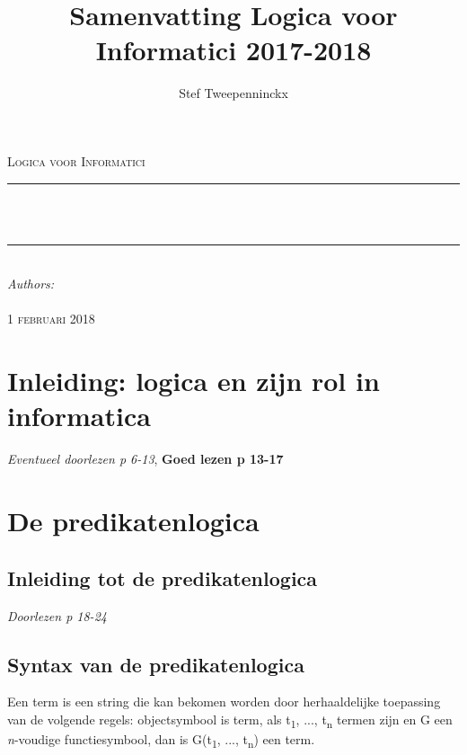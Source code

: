 \documentclass[11pt, a4paper]{article}
\author{Stef Tweepenninckx}
\title{Samenvatting Logica voor Informatici 2017-2018}
\makeatletter
\def\printtitle{                 
    {\large \@title}}
\def\printauthor{                  
    {\large \@author}}
\makeatother
\begin{document}
\begin{titlepage}
\newcommand{\HRule}{\rule{\linewidth}{0.5mm}} 
\center 
\textsc{\LARGE Logica voor Informatici}\\[1.5cm] 
\HRule \\[0.4cm]

{\huge \bfseries \printtitle}\\[0.4cm] 
\HRule \\[0.4cm]

\Large \emph{Authors:}\\
 \textsc{\printauthor}\\[3cm]

{\large \textsc{1 februari 2018}}\\[3cm] 

\vfill 
\end{titlepage}
\tableofcontents
\newpage
{}

\section{Inleiding: logica en zijn rol in informatica}
\textit{Eventueel doorlezen p 6-13}, \textbf{Goed lezen p 13-17}

\section{De predikatenlogica}
\subsection{Inleiding tot de predikatenlogica}
\textit{Doorlezen p 18-24}
\subsection{Syntax van de predikatenlogica}
Een term is een string die kan bekomen worden door herhaaldelijke toepassing van de volgende regels: objectsymbool is term, als t\textsubscript{1}, ..., t\textsubscript{n} termen zijn en G een \textit{n}-voudige functiesymbool, dan is G(t\textsubscript{1}, ..., t\textsubscript{n}) een term.\\
\end{document}
